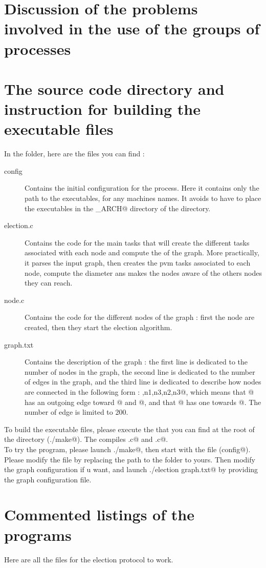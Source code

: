 \documentclass{article}
\begin{document}
\section{Discussion of the problems involved in the use of the groups of processes}

\section{The source code directory and instruction for building the executable files}
In the \verb@code@ folder, here are the files you can find : 
\begin{description}
\item[config] Contains the initial configuration for the \verb@pvm@ process. Here it contains only the path to the executables, for any machines names. It avoids to have to place the executables in the \verb@PVM_ARCH@ directory of the \verb@pvm@ directory.
\item[election.c] Contains the code for the main tasks that will create the different \verb@pvm@ tasks associated with each node and compute the \verb@diameter@ of the graph. More practically, it parses the input graph, then creates the pvm tasks associated to each node, compute the diameter ans makes the nodes aware of the others nodes they can reach.
\item[node.c] Contains the code for the different nodes of the graph : first the node are created, then they start the election algorithm.
\item[graph.txt] Contains the description of the graph : the first line is dedicated to the number of nodes in the graph, the second line is dedicated to the number of edges in the graph, and the third line is dedicated to describe how nodes are connected in the following form : ,{n1,n3},{n2,n3}@, which means that @ has an outgoing edge toward @ and @, and that @ has one towards @. The number of edge is limited to 200.
\end{description}

To build the executable files, please execute the \verb@makefile@ that you can find at the root of the directory (\verb@./make@). The \verb@makefile@ compiles \verb@election.c@ and \verb@node.c@.\\

To try the program, please launch \verb@./make@, then start \verb@pvm@ with the \verb@config@ file (\verb@pvm config@). Please modify the \verb@config@ file by replacing the path to the \verb@code@ folder to yours. Then modify the graph configuration if u want, and launch \verb@./election graph.txt@ by providing the graph configuration file.

\section{Commented listings of the programs}
Here are all the files for the election protocol to work.






\end{document}
